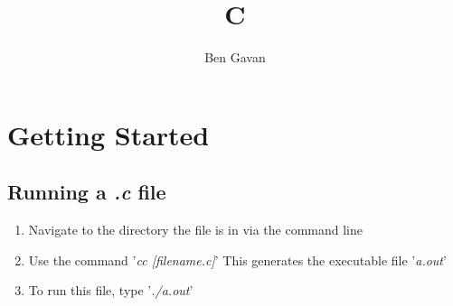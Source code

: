 \documentclass[]{article}
\title{C}
\author{Ben Gavan}
\renewcommand{\it}[1]{\textit{#1}}
\begin{document}
\maketitle

\begin{abstract}

\end{abstract}

\section{Getting Started}

\subsection{Running a \it{.c} file}
\begin{enumerate}
	\item Navigate to the directory the file is in via the command line
	\item Use the command '\it{cc [filename.c]}'
	\subitem This generates the executable file '\it{a.out}'
	\item To run this file, type '\it{./a.out}'
\end{enumerate}
\end{document}
